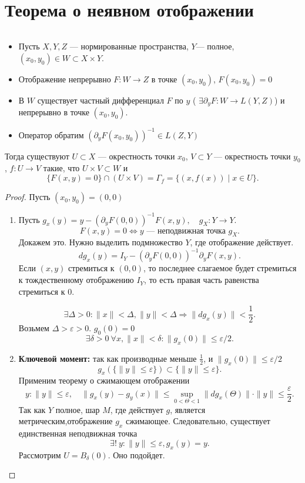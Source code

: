 \section{Теорема о неявном отображении}
\begin{thm}
    $ $
    \begin{itemize}[noitemsep]
	\item Пусть $ X, Y, Z$ --- нормированные пространства,   $ Y$--- полное, $ (x_0, y_0) \in W \subset X \times Y$.
	\item Отображение непрерывно $ F \colon W \to  Z$ в точке $ (x_0, y_0)$, $ F(x_0, y_0) = 0$
	    \item В $ W$ существует частный дифференциал  $ F$ по  $ y$ ( $ \exists  \partial _y F \colon W \to  L(Y, Z)$) и непрерывно в точке $ (x_0, y_0)$.
	    \item  Оператор обратим $ (\partial _yF(x_0, y_0) )^{-1} \in  L(Z, Y)$
    \end{itemize}
    Тогда существуют $ U \subset X$ --- окрестность точки $ x_0$, $ V \subset Y$ --- окрестность точки $ y_0$, $ f\colon U \to  V$ такие, что $ U \times V \subset W$ и
    \[
	\{F(x, y) = 0\} \cap (U \times V) = \Gamma _f = \{(x, f(x)) \mid x \in U\}
    .\] 
\end{thm}
\begin{proof}
    Пусть $ (x_0, y_0) = (0, 0)$
    \begin{enumerate}[noitemsep]
	\item Пусть $ g_x (y) = y - \left( \partial _yF(0, 0) \right)^{-1}F(x, y) , \quad g_X\colon Y \to  Y $.
	    \[
		F(x, y) = 0 \Longleftrightarrow y \text{ --- неподвижная точка  } g_X
	    .\] 
	    Докажем это. Нужно выделить подмножество $ Y$, где отображение действует.
	     \[
		 d g_x(y) = I_Y - \left( \partial _yF(0, 0) \right)^{-1}\partial _y F(x, y)
	    .\] 
	    Если $ (x, y)$ стремиться к  $ (0, 0)$, то последнее слагаемое будет стремиться к тождественному отображению  $ I_Y$, то есть правая часть равенства стремиться к 0. 

	    \[
		\exists  \Delta > 0\colon \| x \|  < \Delta , \| y \| < \Delta  \Longrightarrow \| d g_{x}(y) \|  <\frac{1}{2}
	    .\] 
	    Возьмем $ \Delta > \varepsilon > 0$. $ g_0(0) = 0$
	     \[
		 \exists \delta >0 ~ \forall x , \|  x  \| < \delta \colon \| g_x(0) \| \le \varepsilon /2  
	    .\] 

	\item {\bf Ключевой момент:}  
	    так как производные меньше $ \frac{1}{2}$, и $ \|g_x(0)\| \le \varepsilon /2$
	    \[
		g_x\left(\{\| y \| \le \varepsilon  \}\right) \subset \{\| y \| \le \varepsilon  \}
	    .\] 
	    Применим теорему о сжимающем отображении
	    \[
		y \colon \|  y \| \le \varepsilon, \quad	\| g_x(y) - g_y(x) \|  \le \sup_{0 < \Theta < 1} \|  dg_x(\Theta) \| \cdot \| y \| \le  \frac{\varepsilon}{2}
	    .\] 
	    Так как $ Y$ полное, шар $ M$, где действует $ g$, является метрическим,отображение $ g_x$ сжимающее. Следовательно, существует единственная неподвижная точка
	     \[
		 \exists ! ~y\colon \| y \| \le \varepsilon ,   g_x(y) = y
	     .\] 
	     Рассмотрим $ U = B_{\delta }(0)$. Оно подойдет.
    \end{enumerate}
\end{proof}
